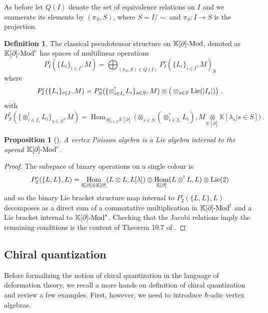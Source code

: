 \documentclass[11pt]{amsart}
\numberwithin{equation}{section}
\newtheorem{prop}[theo]{Proposition}
\theoremstyle{definition}
\newtheorem{defn}[theo]{Definition}
\newcommand{\bb}{\mathbb}
\DeclareMathOperator{\Hom}{Hom}
\newcommand{\Mod}{{\textup{-Mod}}}
\newcommand{\ik}{{\bb K}}
\newcommand{\Lie}{{\textup{Lie}}}
\newcommand{\boxt}{{{\boxtimes }}}
\newcommand{\0}{{\textbf{0}}}
\newcommand{\tensor}[1]{\underset{#1}{\otimes}}
\begin{document}
As before let $Q(I)$ denote the set of equivalence relations on $I$ and we enumerate its elements by $(\pi_S,S)$, where $S= I/\sim$ and $\pi_S: I\rightarrow S$ is the projection.
\begin{defn}
	The classical pseudotensor structure on $\ik[\partial]\Mod$, denoted as $\ik[\partial]\Mod^c$ has spaces of multilinear operations
	\[
	P^c_I(\{L_i\}_{i\in I},M) = \bigoplus_{(\pi_S,S)\in Q(I)} P^c_I(\{L_i\}_{i\in I},M)_S
	\]
	where 
	\[
	P^c_I(\{L_i\}_{i\in I},M) = P_S^*(\{\otimes_{i\in I_s}^! L_i\}_{s\in S},M)\otimes \big(\otimes_{s\in S}\Lie(|I_s|)\big)~.
	\]
	with 
	\[
	P_S^*(\{\otimes_{i\in I_s}^! L_i \}_{s\in S},M) = \Hom_{\otimes_{s\in S}\ik[\partial]}\big(\otimes_{s\in S} (\otimes_{i\in I_s}^!L_i), M\tensor{\ik[\partial]}\ik[\lambda_s|s\in S]\big)~.
	\]
\end{defn}
\begin{prop}[\cite{BDSHK19}]
	A vertex Poisson algebra is a Lie algebra internal to the operad $\ik[\partial]\Mod^c$.
\end{prop}
\begin{proof}
The subspace of binary operations on a single colour is 
\[
P^c_2(\{L,L\},L) = \Hom_{\ik[\partial]\otimes \ik[\partial]}(L\otimes L , L[\lambda]) \oplus\Hom_{\ik[\partial]}(L\otimes^!L,L)\otimes\Lie(2)
\]
and so the binary Lie bracket structure map internal to $P^c_2(\{L,L\},L)$ decomposes as a direct sum of a commutative multiplication in $\ik[\partial]\Mod^!$ and a Lie bracket internal to $\ik[\partial]\Mod^*$. Checking that the Jacobi relations imply the remaining conditions is the content of Theorem 10.7 of \cite{BDSHK19}. 
\end{proof}








\subsection{Chiral quantization}\label{ssec:chiral quantization intro}

Before formalizing the notion of chiral quantization in the language of deformation theory, we recall a more hands on definition of chiral quantization and review a few examples. First, however, we need to introduce $\hbar$-adic vertex algebras.

\end{document}
